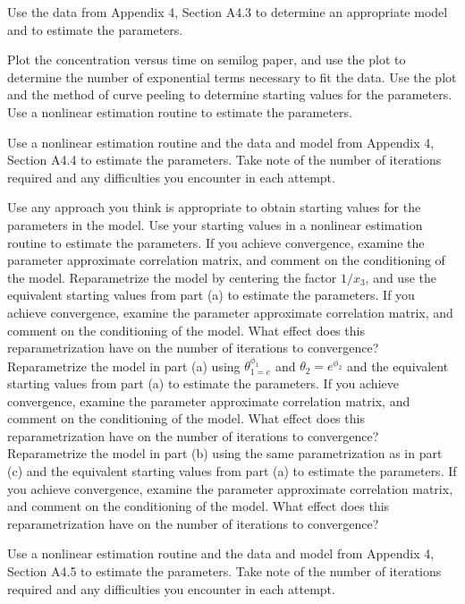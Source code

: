 \begin{problems}
  \prob Use the data from Appendix 4, Section A4.3 to determine an
  appropriate model and to estimate the parameters.
  
  \subprob Plot the concentration versus time on semilog paper,
  and use the plot to determine the number of
  exponential terms necessary to fit the data.
  \subprob Use the plot and the method of curve peeling to
  determine starting values for the parameters.
  \subprob Use a nonlinear estimation routine to estimate the
  parameters.
  
  \prob Use a nonlinear estimation routine and the data and model
  from Appendix 4, Section A4.4 to estimate the parameters.
  Take note of the number of iterations required and any
  difficulties you encounter in each attempt.
  
  \subprob Use any approach you think is appropriate to obtain
  starting values for the parameters in the model.
  \subprob Use your starting values in a nonlinear estimation
  routine to estimate the parameters.
  If you achieve convergence, examine the parameter
  approximate correlation matrix, and comment on the
  conditioning of the model.
  \subprob Reparametrize the model by centering the factor $1/x_3$,
  and use the equivalent starting values from
  part (a) to estimate the parameters.
  If you achieve convergence, examine the parameter
  approximate correlation matrix, and comment on the
  conditioning of the model.
  What effect does this reparametrization have on the
  number of iterations to convergence?
  \subprob Reparametrize the model in part (a) using
  $\theta_{1=e}^{ \phi_1 }$ and $\theta_2=e^{\phi_2}$
  and the equivalent starting values from part (a)
  to estimate the parameters.
  If you achieve convergence, examine the parameter
  approximate correlation matrix, and comment on the
  conditioning of the model.
  What effect does this reparametrization have on the
  number of iterations to convergence?
  \subprob Reparametrize the model in part (b) using the same
  parametrization as in part (c) and the equivalent
  starting values from part (a) to estimate the
  parameters.
  If you achieve convergence, examine the parameter
  approximate correlation matrix, and comment on the
  conditioning of the model.
  What effect does this reparametrization have on the
  number of iterations to convergence?
  
  \prob Use a nonlinear estimation routine and the data and
  model from Appendix 4, Section A4.5 to estimate the
  parameters.
  Take note of the number of iterations required and
  any difficulties you encounter in each attempt.
  

\end{problems}
